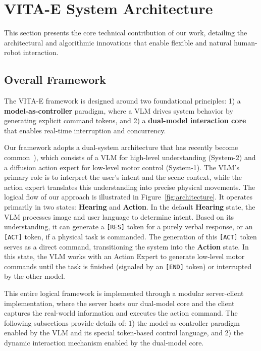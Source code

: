 \section{VITA-E System Architecture}
\label{sec:architecture}

This section presents the core technical contribution of our work, detailing the architectural and algorithmic innovations that enable flexible and natural human-robot interaction.

\subsection{Overall Framework}

The VITA-E framework is designed around two foundational principles: 1) a \textbf{model-as-controller} paradigm, where a VLM drives system behavior by generating explicit command tokens, and 2) a \textbf{dual-model interaction core} that enables real-time interruption and concurrency.

Our framework adopts a dual-system architecture that has recently become common~\citep{gr00t, pi0}), which consists of a VLM for high-level understanding (System-2) and a diffusion action expert for low-level motor control (System-1). The VLM's primary role is to interpret the user's intent and the scene context, while the action expert translates this understanding into precise physical movements. The logical flow of our approach is illustrated in Figure~\ref{fig:architecture}. It operates primarily in two states: \textbf{Hearing} and \textbf{Action}. In the default \textbf{Hearing} state, the VLM processes image and user language to determine intent. Based on its understanding, it can generate a \texttt{[RES]} token for a purely verbal response, or an \texttt{[ACT]} token, if a physical task is commanded. The generation of this \texttt{[ACT]} token serves as a direct command, transitioning the system into the \textbf{Action} state. In this state, the VLM works with an Action Expert to generate low-level motor commands until the task is finished (signaled by an \texttt{[END]} token) or interrupted by the other model.

This entire logical framework is implemented through a modular server-client implementation, where the server hosts our dual-model core and the client captures the real-world information and executes the action command. The following subsections provide details of: 1) the model-as-controller paradigm enabled by the VLM and its special token-based control language, and 2) the dynamic interaction mechanism enabled by the dual-model core.

